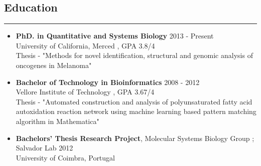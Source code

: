 \documentclass[line,margin]{resume_type2}
\begin{document}
\address{  rgupta6@ucmerced.edu \\ (530) 574-3742 }
\address{ \href {http://rgupta.in}   {www.rgupta.in} \\  \href {http://github.com/rg-code} {github.com/rg-code}}

\begin{resume}

\section{Education}\hskip 4pt {\hfill \color{gray} \rule{14.7 cm}{0.1 pt}}
\begin{itemize}
                    \vskip 3pt
                    \item[]
                    {\textbf{PhD. in Quantitative and Systems Biology}}{\color{gray} \hfill 2013 - Present}\\
                    {University of California, Merced} {, GPA 3.8/4}\\
                    {\small{ Thesis} - "Methods for novel identification, structural and genomic analysis of oncogenes in  Melanoma"}
                    \vskip 5pt
                    \item[]
                    {\textbf{Bachelor of Technology in Bioinformatics }} {\color{gray} \hfill 2008 - 2012}\\
                    Vellore Institute of Technology , GPA 3.67/4 \\
                    {\small{ Thesis} - "Automated construction and analysis of polyunsaturated fatty acid autoxidation reaction network using machine learning based pattern matching algorithm in Mathematica"}
                    \item[]
                    \vskip 5pt
                    {\textbf{Bachelors' Thesis Research Project}}, { Molecular Systems Biology Group ; Salvador Lab}{\color{gray} \hfill 2012} \\
                    University of Coimbra, Portugal
		            
\end{itemize}
		            \vskip 10pt
		            

\end{resume}
\end{document}
